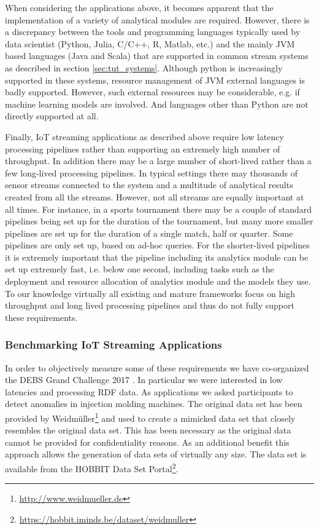 When considering the applications above, it becomes apparent that the implementation of a variety of analytical modules are required. However, there is a discrepancy between the tools and programming languages typically used by data scientist (Python, Julia, C/C++, R, Matlab, etc.) and the mainly JVM based languages (Java and Scala) that are supported in common stream systems as described in section \ref{sec:tut_systems}. Although python is increasingly supported in these systems, resource management of JVM external languages is badly supported. However, such external resources may be considerable, e.g. if machine learning models are involved. And languages other than Python are not directly supported at all.

Finally, IoT streaming applications as described above require low latency processing pipelines rather than supporting an extremely high number of throughput. In addition there may be a large number of short-lived rather than a few long-lived processing pipelines. In typical settings there may thousands of sensor streams connected to the system and a multitude of analytical results created from all the streams. However, not all streams are equally important at all times. For instance, in a sports tournament there may be a couple of standard pipelines being set up for the duration of the tournament, but many more smaller pipelines are set up for the duration of a single match, half or quarter. Some pipelines are only set up, based on ad-hoc queries. For the shorter-lived pipelines it is extremely important that the pipeline including its analytics module can be set up extremely fast, i.e. below one second, including tasks such as the deployment and resource allocation of analytics module and the models they use. To our knowledge virtually all existing and mature frameworks focus on high throughput and long lived processing pipelines and thus do not fully support these requirements. 

\subsubsection{Benchmarking IoT Streaming Applications}\label{subsubsec:benchmarking}

In order to objectively measure some of these requirements we have co-organized the DEBS Grand Challenge 2017 \cite{gulisano_et_al_2017}. In particular we were interested in low latencies and processing RDF data. As applications we asked participants to detect anomalies in injection molding machines. The original data set has been provided by Weidmüller\footnote{\url{http://www.weidmueller.de}} and used to create a mimicked data set that closely resembles the original data set. This has been necessary as the original data cannot be provided for confidentiality reasons. As an additional benefit this approach allows the generation of data sets of virtually any size. The data set is available from the HOBBIT Data Set Portal\footnote{\url{https://hobbit.iminds.be/dataset/weidmuller}}.

